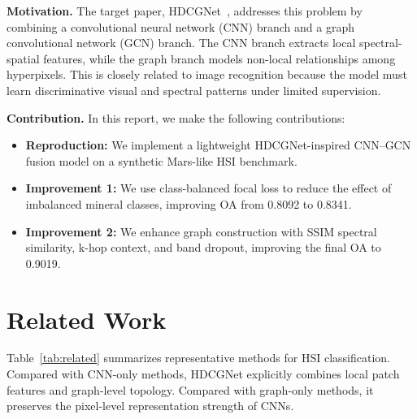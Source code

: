 \documentclass[conference]{IEEEtran}
\begin{document}
\noindent\textbf{Motivation.}
The target paper, HDCGNet~\cite{original_paper}, addresses this problem by combining a convolutional neural network (CNN) branch and a graph convolutional network (GCN) branch. The CNN branch extracts local spectral-spatial features, while the graph branch models non-local relationships among hyperpixels. This is closely related to image recognition because the model must learn discriminative visual and spectral patterns under limited supervision.

\noindent\textbf{Contribution.}
In this report, we make the following contributions:
\begin{itemize}
    \item \textbf{Reproduction:} We implement a lightweight HDCGNet-inspired CNN--GCN fusion model on a synthetic Mars-like HSI benchmark.
    \item \textbf{Improvement 1:} We use class-balanced focal loss to reduce the effect of imbalanced mineral classes, improving OA from 0.8092 to 0.8341.
    \item \textbf{Improvement 2:} We enhance graph construction with SSIM spectral similarity, k-hop context, and band dropout, improving the final OA to 0.9019.
\end{itemize}

\section{Related Work}
Table~\ref{tab:related} summarizes representative methods for HSI classification. Compared with CNN-only methods, HDCGNet explicitly combines local patch features and graph-level topology. Compared with graph-only methods, it preserves the pixel-level representation strength of CNNs.
\end{document}
